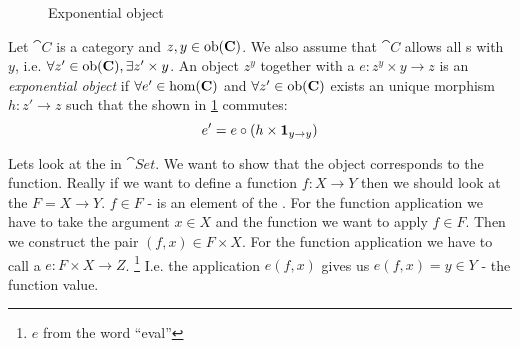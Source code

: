 \begin{definition}[Exponential]
\label{def:exponential}
\begin{figure}
  \centering
  \caption{Exponential object}
  \label{fig:exponential}
\end{figure}
Let $\cat{C}$ is a category and $z, y \in \mathrm{ob}(\mathbf{C})$. We also assume
that $\cat{C}$ allows all s with $y$, i.e.
$\forall z' \in \mathrm{ob}(\mathbf{C}), \exists z' \times y$. An object $z^y$
together with a  $e: z^y \times y \to z$ is 
an \textit{exponential object} if $\forall e' \in \mathrm{hom}(\mathbf{C})$ and
$\forall z' \in \mathrm{ob}(\mathbf{C})$ exists an
unique morphism $h: z' \to z$ such that the
 shown in \cref{fig:exponential}
commutes:
\[
e' = e \circ \left(h \times \mathbf{1}_{ y \to y } \right)
\]
\end{definition}

\begin{example}
\label{ex:exponential_set}
Lets look at the  in $\cat{Set}$. We want
to show that the object corresponds to the function. Really if we want
to define a function $f: X \to Y$ then we should look at the
 $F = X \to Y$. $f \in F$ - is an element of the
. For the function application we have to take the argument $x
\in X$ and the function we want to apply $f \in F$. Then we construct
the pair $(f,x) \in F \times X$. For the function application we have
to call a  $e: F \times X \to Z$.
\footnote{$e$ from the word ``eval''}
I.e. the
application $e(f, x)$ gives us $e(f, x) = y \in Y$ - the function
value. 
\end{example}

